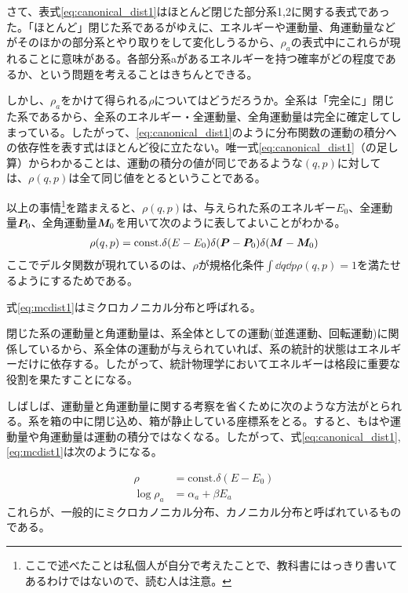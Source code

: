 \documentclass[uplatex,dvipdfmx]{jsarticle}
\begin{document}
        さて、表式\eqref{eq:canonical_dist1}はほとんど閉じた部分系1,2に関する表式であった。「ほとんど」閉じた系であるがゆえに、エネルギーや運動量、角運動量などがそのほかの部分系とやり取りをして変化しうるから、$\rho_a$の表式中にこれらが現れることに意味がある。各部分系aがあるエネルギーを持つ確率がどの程度であるか、という問題を考えることはきちんとできる。

        しかし、$\rho_a$をかけて得られる$\rho$についてはどうだろうか。全系は「完全に」閉じた系であるから、全系のエネルギー・全運動量、全角運動量は完全に確定してしまっている。したがって、\eqref{eq:canonical_dist1}のように分布関数の運動の積分への依存性を表す式はほとんど役に立たない。唯一式\eqref{eq:canonical_dist1}（の足し算）からわかることは、運動の積分の値が同じであるような$(q,p)$に対しては、$\rho(q,p)$は全て同じ値をとるということである。

        以上の事情\footnote{ここで述べたことは私個人が自分で考えたことで、教科書にはっきり書いてあるわけではないので、読む人は注意。}を踏まえると、$\rho(q,p)$は、与えられた系のエネルギー$E_0$、全運動量$\vb*{P}_0$、全角運動量$\vb*{M}_0$を用いて次のように表してよいことがわかる。
        \begin{align}
            \rho(q,p) = \text{const.}\delta(E-E_0)\delta(\vb*{P}-\vb*{P}_0)\delta(\vb*{M}-\vb*{M}_0) \label{eq:mcdist1}
        \end{align}
        ここでデルタ関数が現れているのは、$\rho$が規格化条件$\int \dd{q}\dd{p} \rho(q,p) = 1$を満たせるようにするためである。

        式\eqref{eq:mcdist1}はミクロカノニカル分布と呼ばれる。

        閉じた系の運動量と角運動量は、系全体としての運動(並進運動、回転運動)に関係しているから、系全体の運動が与えられていれば、系の統計的状態はエネルギーだけに依存する。したがって、統計物理学においてエネルギーは格段に重要な役割を果たすことになる。

        しばしば、運動量と角運動量に関する考察を省くために次のような方法がとられる。系を箱の中に閉じ込め、箱が静止している座標系をとる。すると、もはや運動量や角運動量は運動の積分ではなくなる。したがって、式\eqref{eq:canonical_dist1},\eqref{eq:mcdist1}は次のようになる。

        \begin{align}
            \rho &= \text{const.}\delta(E-E_0) \\
            \log \rho_a &= \alpha_a + \beta E_a            
        \end{align}
        これらが、一般的にミクロカノニカル分布、カノニカル分布と呼ばれているものである。
\end{document}
